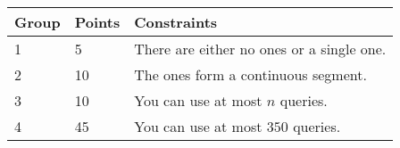 \noindent
\begin{tabular}{| l | l | l |}
\hline
Group & Points & Constraints \\ \hline
1     & 5     & There are either no ones or a single one. \\ \hline
2     & 10    & The ones form a continuous segment. \\ \hline
3     & 10    & You can use at most $n$ queries. \\ \hline
4     & 45    & You can use at most $350$ queries. \\ \hline
\end{tabular}
